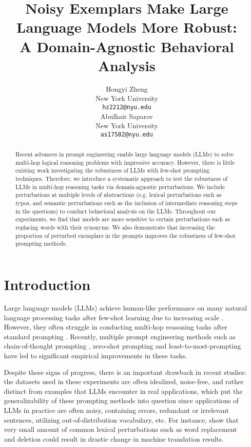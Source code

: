 \documentclass[11pt]{article}
\title{Noisy Exemplars Make Large Language Models More Robust: \\ A Domain-Agnostic Behavioral Analysis}
\author{Hongyi Zheng \\
  New York University \\
  \texttt{hz2212@nyu.edu} \\
  \And
  Abulhair Saparov \\
  New York University \\
  \texttt{as17582@nyu.edu} \\
  }
\begin{document}
\maketitle

\begin{abstract}
Recent advances in prompt engineering enable large language models (LLMs) to solve multi-hop logical reasoning problems with impressive accuracy. However, there is little existing work investigating the robustness of LLMs with few-shot prompting techniques. Therefore, we introduce a systematic approach to test the robustness of LLMs in multi-hop reasoning tasks via domain-agnostic perturbations. We include perturbations at multiple levels of abstractions (e.g. lexical perturbations such as typos, and semantic perturbations such as the inclusion of intermediate reasoning steps in the questions) to conduct behavioral analysis on the LLMs. Throughout our experiments, we find that models are more sensitive to certain perturbations such as replacing words with their synonyms. We also demonstrate that increasing the proportion of perturbed exemplars in the prompts improves the robustness of few-shot prompting methods.
\end{abstract}

\section{Introduction}

Large language models (LLMs) achieve human-like performance on many natural language processing tasks after few-shot learning due to increasing scale \cite{kaplan2020scaling}. However, they often struggle in conducting multi-hop reasoning tasks after standard prompting \cite{DBLP:journals/corr/abs-2112-11446}. Recently, multiple prompt engineering methods such as chain-of-thought prompting \cite{wei2023chainofthought}, zero-shot prompting \cite{kojima2023large} and least-to-most-prompting \cite{zhou2023leasttomost} have led to significant empirical improvements in these tasks.

Despite these signs of progress, there is an important drawback in recent studies: the datasets used in these experiments are often idealized, noise-free, and rather distinct from examples that LLMs encounter in real applications, which put the generalizability of these prompting methods into question since applications of LLMs in practice are often noisy, containing errors, redundant or irrelevant sentences, utilizing out-of-distribution vocabulary, etc. For instance, \citet{cheng-etal-2018-towards} show that very small amount of common lexical perturbations such as word replacement and deletion could result in drastic change in machine translation results.
\end{document}
